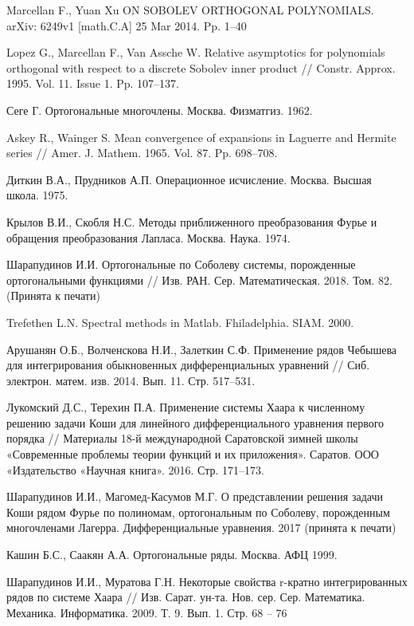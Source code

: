 \begin{thebibliography}{111}
{Marcellan F., Yuan Xu}
ON SOBOLEV ORTHOGONAL POLYNOMIALS. arXiv: 6249v1 [math.C.A] 25 Mar 2014. Pp. 1--40


{Lopez G., Marcellan F., Van Assche W.}
Relative asymptotics for polynomials orthogonal with respect to a discrete Sobolev inner product // Constr. Approx. 1995. Vol. 11. Issue 1. Pp. 107--137.


{Сеге Г.}
Ортогональные многочлены. Москва. Физматгиз. 1962.


{Askey R., Wainger S.}
Mean convergence of expansions in Laguerre and Hermite series // Amer. J. Mathem. 1965. Vol. 87. Pp. 698--708.


{Диткин В.А., Прудников А.П.}
Операционное исчисление. Москва. Высшая школа. 1975.


{Крылов В.И., Скобля Н.С.}
Методы приближенного преобразования Фурье и обращения преобразования Лапласа. Москва. Наука. 1974.


Шарапудинов И.И. Ортогональные  по Соболеву системы, порожденные ортогональными функциями // Изв. РАН. Сер. Математическая. 2018. Том. 82. (Принята к печати)


{Trefethen  L.N.}
Spectral methods in Matlab. Fhiladelphia. SIAM. 2000.


{Арушанян О.Б., Волченскова Н.И., Залеткин С.Ф.}
Применение рядов Чебышева для интегрирования обыкновенных дифференциальных уравнений // Сиб. электрон. матем. изв. 2014. Вып. 11. Стр. 517--531.


{Лукомский Д.С., Терехин П.А.}
Применение системы Хаара к численному решению задачи Коши для линейного дифференциального уравнения первого порядка // Материалы 18-й международной Саратовской зимней школы «Современные проблемы теории функций и их приложения». Саратов. ООО «Издательство «Научная книга». 2016. Стр. 171--173.


{Шарапудинов И.И., Магомед-Касумов М.Г.}
О представлении решения задачи Коши  рядом Фурье  по полиномам, ортогональным по  Соболеву, порожденным многочленами Лагерра. Дифференциальные уравнения. 2017 (принята к печати)


{Кашин Б.С., Саакян А.А.}
Ортогональные ряды. Москва. АФЦ 1999.


{Шарапудинов И.И., Муратова Г.Н.}
Некоторые свойства r-кратно интегрированных рядов по системе Хаара // Изв. Сарат. ун-та. Нов. сер. Сер. Математика. Механика. Информатика. 2009. Т. 9. Вып. 1. Стр. 68 -- 76



\end{thebibliography}
